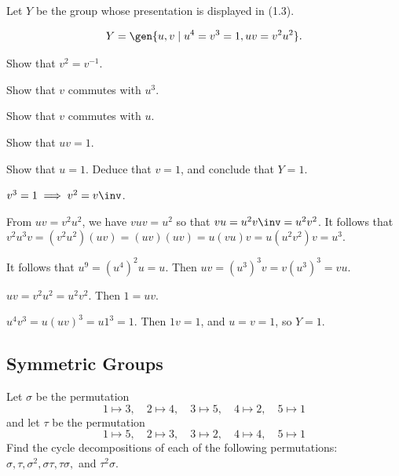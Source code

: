 \begin{exercise}\label{ex1.2.18}
    Let $Y$ be the group whose presentation is displayed in (1.3).

    \[Y = \gen{u, v \mid u^4 = v^3 = 1, uv = v^2u^2}.\]
    \begin{subproblems}
        \item Show that $v^2 = v^{-1}$.
        
        \item Show that $v$ commutes with $u^3$.
        
        \item Show that $v$ commutes with $u$.
        
        \item Show that $uv = 1$.
        
        \item Show that $u = 1$. Deduce that $v = 1$, and conclude that $Y = 1$.
        
    \end{subproblems}
\end{exercise}

\begin{solalph}
    \item $v^3 = 1 \implies v^2 = v\inv$.
    \item From $uv = v^2u^2$, we have $vuv = u^2$ so that $vu = u^2v\inv = u^2v^2$. It follows that $v^2u^3v = (v^2u^2)(uv) = (uv)(uv) = u(vu)v = u(u^2v^2)v = u^3$.
    \item It follows that $u^9 = (u^4)^2u = u$. Then $uv = (u^3)^3v = v(u^3)^3 = vu$.
    \item $uv = v^2u^2 = u^2v^2$. Then $1 = uv$.
    \item $u^4v^3 = u(uv)^3 = u1^3 = 1$. Then $1v = 1$, and $u = v = 1$, so $Y = 1$.
\end{solalph}

\newpage

\subsection{Symmetric Groups}

\begin{exercise} \label{ex1.3.1}
    Let $\sigma$ be the permutation
    \[1 \mapsto 3, \quad 2 \mapsto 4, \quad 3 \mapsto 5, \quad 4 \mapsto 2, \quad 5 \mapsto 1\]
    and let $\tau$ be the permutation
    \[1 \mapsto 5, \quad 2 \mapsto 3, \quad 3 \mapsto 2, \quad 4 \mapsto 4, \quad 5 \mapsto 1\]
    Find the cycle decompositions of each of the following permutations:
    $\sigma, \tau, \sigma^2, \sigma\tau, \tau\sigma,$ and $\tau^2\sigma.$
\end{exercise}

